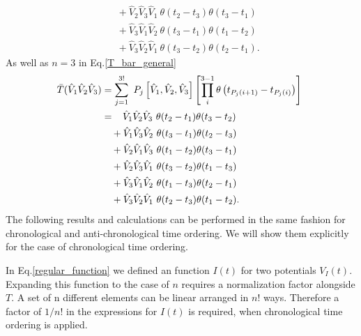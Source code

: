 \documentclass[
12pt, %
english, %
singlespacing, %
headsepline, %
]{MastersDoctoralThesis} %
\begin{document}
\begin{subappendices}
\begin{equation}
\begin{split}
	\\
	& \ \ \ +\hat{V}_{2}\hat{V}_{3}\hat{V}_{1}\   \theta(t_{2}-t_{3})\theta(t_{3}-t_{1})
	\\
	& \ \ \ +\hat{V}_{3}\hat{V}_{1}\hat{V}_{2}\   \theta(t_{3}-t_{1})\theta(t_{1}-t_{2})
	\\
	& \ \ \ +\hat{V}_{3}\hat{V}_{2}\hat{V}_{1}\  \theta(t_{3}-t_{2})\theta(t_{2}-t_{1}).
\end{split}
\end{equation}
As well as $ n=3 $ in Eq.\enskip\eqref{T_bar_general}
\begin{equation}
\begin{split}
\bar{T}(\hat{V}_1 \hat{V}_2\hat{V}_3)
&=
\sum_{j=1}^{3!}\ P_{j}
\left[
\hat{V}_1, \hat{V}_2,\hat{V}_3
 \right]  
\left[
\prod^{3-1}_{i}
\theta
	\left(
	t_{P_{j}(i+1)}-t_{P_{j}(i)}
	\right)
\right]\
\\
&=\enspace\thinspace\thinspace
\hat{V}_{1}\hat{V}_{2}\hat{V}_{3}\  \theta(t_2 -t_1)\theta(t_3 -t_2)
	\\
	& \ \ \ +\hat{V}_{1}\hat{V}_{3}\hat{V}_{2}\   \theta(t_3 -t_1)\theta(t_2 -t_3)
	\\
	& \ \ \ +\hat{V}_{2}\hat{V}_{1}\hat{V}_{3}\  \theta(t_1 -t_2)\theta(t_3 -t_1)
	\\
	& \ \ \ +\hat{V}_{2}\hat{V}_{3}\hat{V}_{1}\   \theta(t_3 -t_2)\theta(t_1 -t_3)
	\\
	& \ \ \ +\hat{V}_{3}\hat{V}_{1}\hat{V}_{2} \  \theta(t_1 -t_3)\theta(t_2 -t_1)
	\\
	& \ \ \ +\hat{V}_{3}\hat{V}_{2}\hat{V}_{1} \  \theta(t_2 -t_3)\theta(t_1 -t_2)
.
\end{split}
\end{equation}
The following results and calculations can be performed in the same fashion for chronological and anti-chronological time ordering. We will show them explicitly for the case of chronological time ordering.

In Eq.\enskip\eqref{regular_function} we defined an function $ I(t)$ for two potentials $ V_I(t) $. Expanding this function to the case of $ n $ requires a normalization factor alongside $ T $. A set of n different elements can be linear arranged in $ n! $ ways. Therefore a factor of $ 1/{n!} $ in the expressions for $ I(t)$ is required, when chronological time ordering is applied.  


\end{subappendices}
\end{document}

